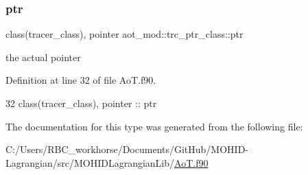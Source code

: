 \subsubsection{\texorpdfstring{ptr}{ptr}}
{\footnotesize\ttfamily class(tracer\+\_\+class), pointer aot\+\_\+mod\+::trc\+\_\+ptr\+\_\+class\+::ptr\hspace{0.3cm}{\ttfamily [private]}}



the actual pointer 



Definition at line 32 of file Ao\+T.\+f90.


\begin{DoxyCode}
32         \textcolor{keywordtype}{class}(tracer\_class), \textcolor{keywordtype}{pointer} :: ptr
\end{DoxyCode}


The documentation for this type was generated from the following file\+:\begin{DoxyCompactItemize}
\item 
C\+:/\+Users/\+R\+B\+C\+\_\+workhorse/\+Documents/\+Git\+Hub/\+M\+O\+H\+I\+D-\/\+Lagrangian/src/\+M\+O\+H\+I\+D\+Lagrangian\+Lib/\mbox{\hyperlink{_ao_t_8f90}{Ao\+T.\+f90}}\end{DoxyCompactItemize}
